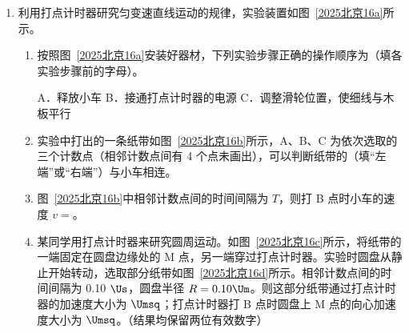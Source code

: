 \documentclass[\gkver]{gaokaozhenti}
\begin{document}
\begin{enumerate}
{B．电阻 $R_{1}$ 断路，连接 A、B 时，电流通过表头和 $R_{2}$ 与欧姆挡构成闭合回路，表头偏转，B 错误；

C．电阻 $R_{2}$ 断路，连接 A、B 时，电流无法通过表头和 $R_{2}$ 与欧姆挡构成闭合回路，表头不偏转；连接 A、C 和 B、C 均能与欧姆挡构成闭合回路，表头发生偏转，C 正确。

故选 C。
}

\item
利用打点计时器研究匀变速直线运动的规律，实验装置如图~\ref{2025北京16a}所示。


\begin{enumerate}
	\item
	按照图~\ref{2025北京16a}安装好器材，下列实验步骤正确的操作顺序为（填各实验步骤前的字母）。

	A．释放小车 \qquad B．接通打点计时器的电源 \qquad C．调整滑轮位置，使细线与木板平行
	\item
	实验中打出的一条纸带如图~\ref{2025北京16b}所示，A、B、C 为依次选取的三个计数点（相邻计数点间有 4 个点未画出），可以判断纸带的（填“左端”或“右端”）与小车相连。
	\item
	图~\ref{2025北京16b}中相邻计数点间的时间间隔为 $T$，则打 B 点时小车的速度 $v = $。
	\item
	某同学用打点计时器来研究圆周运动。如图~\ref{2025北京16c}所示，将纸带的一端固定在圆盘边缘处的 M 点，另一端穿过打点计时器。实验时圆盘从静止开始转动，选取部分纸带如图~\ref{2025北京16d}所示。相邻计数点间的时间间隔为 0.10 $\Us$，圆盘半径 $R = 0.10 \Um$。则这部分纸带通过打点计时器的加速度大小为 $\Umsq$；打点计时器打 B 点时圆盘上 M 点的向心加速度大小为 $\Umsq$。（结果均保留两位有效数字）

\end{enumerate}

\end{enumerate}
\end{document}
